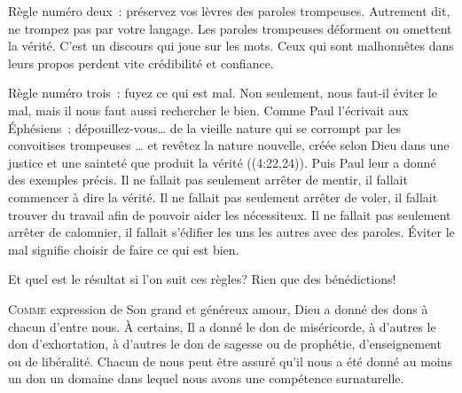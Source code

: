 Règle numéro deux~: préservez vos lèvres des paroles trompeuses.
 Autrement dit, ne trompez pas par votre langage. Les paroles trompeuses
 déforment ou omettent la vérité. C'est un discours qui joue sur les mots.
 Ceux qui sont malhonnêtes dans leurs propos perdent vite
 crédibilité et confiance.


Règle numéro trois~: fuyez ce qui est mal.
 Non seulement, nous faut-il éviter le mal, mais il nous faut aussi rechercher
 le bien. Comme Paul l'écrivait aux Éphésiens~: 
 \og dépouillez-vous\dots{} de la vieille nature qui se corrompt
 par les convoitises trompeuses 
 \dots{} et revêtez la nature nouvelle, créée selon Dieu dans une justice
 et une sainteté que produit la vérité \fg{} 
 ((4:22,24)).
 Puis Paul leur a donné des exemples précis.
 Il ne fallait pas seulement arrêter de mentir,
 il fallait commencer à dire la vérité. Il ne fallait pas seulement arrêter
 de voler, il fallait trouver du travail afin de pouvoir aider les nécessiteux.
 Il ne fallait pas seulement arrêter de calomnier, il fallait s'édifier
 les uns les autres avec des paroles. Éviter le mal signifie choisir
 de faire ce qui est bien.

Et quel est le résultat si l'on suit ces règles? Rien que des bénédictions!

\dvrule






\lettrine{C}{omme} expression de Son grand et généreux amour,
 Dieu a donné des dons à chacun d'entre nous.
 À certains, Il a donné le don de miséricorde, à d'autres le don d'exhortation,
 à d'autres le don de sagesse ou de prophétie, d'enseignement ou de libéralité.
 Chacun de nous peut être assuré qu'il nous a été donné au moins un don
 \ocadr un domaine dans lequel nous avons une compétence surnaturelle.

